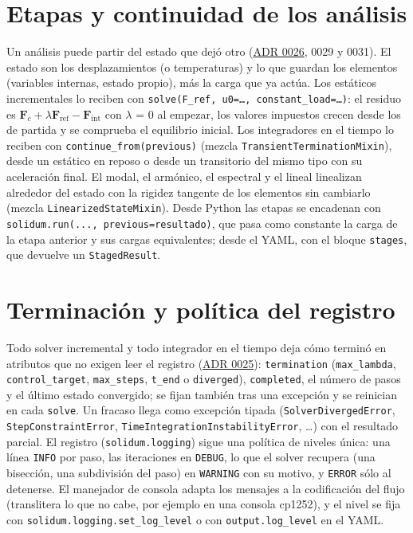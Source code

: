 \documentclass[11pt,oneside]{report}
\begin{document}
\section{Etapas y continuidad de los análisis}

Un análisis puede partir del estado que dejó otro (\hyperref[adr:0026]{ADR 0026}, 0029 y 0031). El estado son los desplazamientos (o temperaturas) y lo que guardan los elementos (variables internas, estado propio), más la carga que ya actúa. Los estáticos incrementales lo reciben con \texttt{solve(F\_\allowbreak{}ref, u0=\ldots{}, constant\_\allowbreak{}load=\ldots{})}: el residuo es $\mathbf F_c + \lambda\mathbf F_\text{ref} - \mathbf F_\text{int}$ con \ensuremath{\lambda} = 0 al empezar, los valores impuestos crecen desde los de partida y se comprueba el equilibrio inicial. Los integradores en el tiempo lo reciben con \texttt{continue\_\allowbreak{}from(previous)} (mezcla \texttt{TransientTerminationMixin}), desde un estático en reposo o desde un transitorio del mismo tipo con su aceleración final. El modal, el armónico, el espectral y el lineal linealizan alrededor del estado con la rigidez tangente de los elementos sin cambiarlo (mezcla \texttt{LinearizedStateMixin}). Desde Python las etapas se encadenan con \texttt{solidum.\allowbreak{}run(.\allowbreak{}.\allowbreak{}.\allowbreak{}, previous=resultado)}, que pasa como constante la carga de la etapa anterior y sus cargas equivalentes; desde el YAML, con el bloque \texttt{stages}, que devuelve un \texttt{StagedResult}.

\section{Terminación y política del registro}

Todo solver incremental y todo integrador en el tiempo deja cómo terminó en atributos que no exigen leer el registro (\hyperref[adr:0025]{ADR 0025}): \texttt{termination} (\texttt{max\_lambda}, \texttt{control\_target}, \texttt{max\_steps}, \texttt{t\_end} o \texttt{diverged}), \texttt{completed}, el número de pasos y el último estado convergido; se fijan también tras una excepción y se reinician en cada \texttt{solve}. Un fracaso llega como excepción tipada (\texttt{SolverDivergedError}, \texttt{StepConstraintError}, \texttt{TimeIntegrationInstabilityError}, \ldots{}) con el resultado parcial. El registro (\texttt{solidum.logging}) sigue una política de niveles única: una línea \texttt{INFO} por paso, las iteraciones en \texttt{DEBUG}, lo que el solver recupera (una bisección, una subdivisión del paso) en \texttt{WARNING} con su motivo, y \texttt{ERROR} sólo al detenerse. El manejador de consola adapta los mensajes a la codificación del flujo (translitera lo que no cabe, por ejemplo en una consola cp1252), y el nivel se fija con \texttt{solidum.\allowbreak{}logging.\allowbreak{}set\_\allowbreak{}log\_\allowbreak{}level} o con \texttt{output.log\_level} en el YAML.
\end{document}
